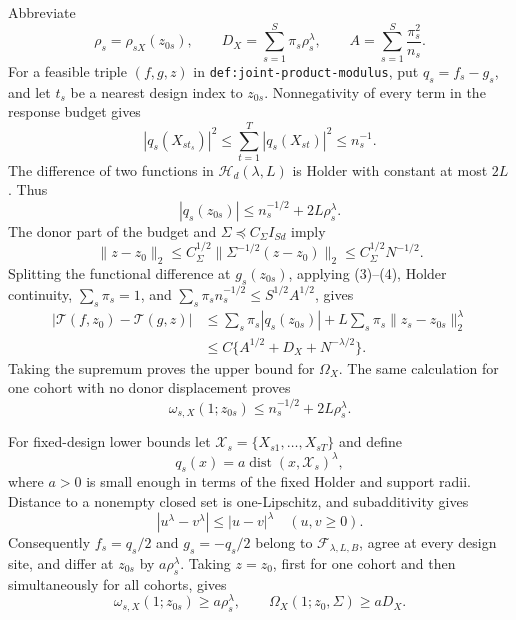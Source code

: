 Abbreviate
\[
 \rho_s=\rho_{sX}(z_{0s}),
 \qquad D_X=\sum_{s=1}^{S}\pi_s\rho_s^\lambda,
 \qquad A=\sum_{s=1}^{S}\frac{\pi_s^2}{n_s}.               \tag{1}
\]
For a feasible triple \((f,g,z)\) in
\texttt{def:joint-product-modulus}, put \(q_s=f_s-g_s\), and let \(t_s\) be a nearest design index to \(z_{0s}\).  Nonnegativity of every term in the response budget gives
\[
 |q_s(X_{st_s})|^2
 \le\sum_{t=1}^{T}|q_s(X_{st})|^2\le n_s^{-1}.             \tag{2}
\]
The difference of two functions in \(\mathcal H_d(\lambda,L)\) is Holder with constant at most \(2L\).  Thus
\[
 |q_s(z_{0s})|
 \le n_s^{-1/2}+2L\rho_s^\lambda.                          \tag{3}
\]
The donor part of the budget and \(\Sigma\preceq C_\Sigma I_{Sd}\) imply
\[
 \|z-z_0\|_2
 \le C_\Sigma^{1/2}\|\Sigma^{-1/2}(z-z_0)\|_2
 \le C_\Sigma^{1/2}N^{-1/2}.                              \tag{4}
\]
Splitting the functional difference at \(g_s(z_{0s})\), applying (3)--(4), Holder continuity, \(\sum_s\pi_s=1\), and
\(\sum_s\pi_sn_s^{-1/2}\le S^{1/2}A^{1/2}\), gives
\[
\begin{aligned}
 |\mathcal T(f,z_0)-\mathcal T(g,z)|
 &\le\sum_s\pi_s|q_s(z_{0s})|
      +L\sum_s\pi_s\|z_s-z_{0s}\|_2^\lambda\\
 &\le C\{A^{1/2}+D_X+N^{-\lambda/2}\}.
\end{aligned}                                               \tag{5}
\]
Taking the supremum proves the upper bound for \(\Omega_X\).  The same calculation for one cohort with no donor displacement proves
\[
 \omega_{s,X}(1;z_{0s})
 \le n_s^{-1/2}+2L\rho_s^\lambda.                          \tag{6}
\]

For fixed-design lower bounds let
\(\mathcal X_s=\{X_{s1},\ldots,X_{sT}\}\) and define
\[
 q_s(x)=a\operatorname{dist}(x,\mathcal X_s)^\lambda,      \tag{7}
\]
where \(a>0\) is small enough in terms of the fixed Holder and support radii.  Distance to a nonempty closed set is one-Lipschitz, and subadditivity gives
\[
 |u^\lambda-v^\lambda|\le|u-v|^\lambda
 \quad(u,v\ge0).                                           \tag{8}
\]
Consequently \(f_s=q_s/2\) and \(g_s=-q_s/2\) belong to
\(\mathcal F_{\lambda,L,B}\), agree at every design site, and differ at \(z_{0s}\) by \(a\rho_s^\lambda\).  Taking \(z=z_0\), first for one cohort and then simultaneously for all cohorts, gives
\[
 \omega_{s,X}(1;z_{0s})\ge a\rho_s^\lambda,
 \qquad
 \Omega_X(1;z_0,\Sigma)\ge aD_X.                           \tag{9}
\]

